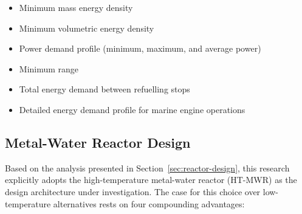\documentclass[12pt]{article}
\begin{document}
\begin{itemize}
    \item Minimum mass energy density
    \item Minimum volumetric energy density
    \item Power demand profile (minimum, maximum, and average power)
    \item Minimum range
    \item Total energy demand between refuelling stops
    \item Detailed energy demand profile for marine engine operations
\end{itemize}

\break

\subsection{Metal-Water Reactor Design}
\label{sec:metal-water-research-questions}

Based on the analysis presented in Section~\ref{sec:reactor-design}, this research 
explicitly adopts the high-temperature metal-water reactor (HT-MWR) as the design 
architecture under investigation. The case for this choice over low-temperature 
alternatives rests on four compounding advantages:
\end{document}
